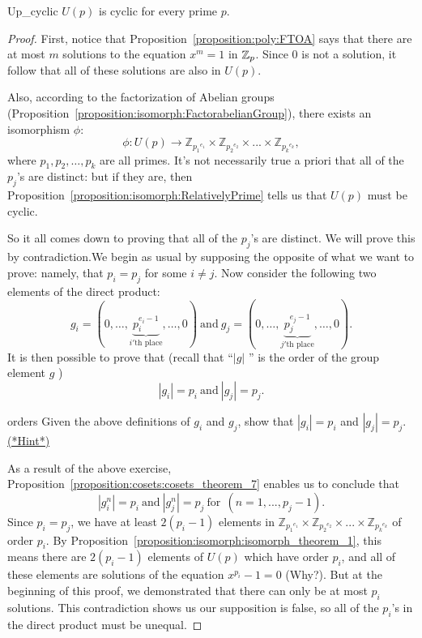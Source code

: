 \begin{prop}{Up_cyclic}
$U(p)$ is cyclic for every prime $p$.
\end {prop}
\begin{proof}
First, notice that Proposition~\ref{proposition:poly:FTOA} says that there are at most $m$ solutions to the equation $x^m = 1$ in $\mathbb{Z}_p$. Since 0 is not a solution, it follow that all of these solutions are also in $U(p)$.

Also, according to the factorization of Abelian groups (Proposition~\ref{proposition:isomorph:FactorabelianGroup}), there exists an isomorphism $\phi$:
\[\phi: U(p)  \rightarrow {\mathbb{Z}_{{p_1}^{e_1}}}  \times   {\mathbb{Z}_{{p_2}^{e_2}}}  \times  ... \times   {\mathbb{Z}_{{p_k}^{e_k}}}, \]
where $p_1, p_2, \ldots, p_k$ are all primes.  It's not necessarily true a priori  that all of the $p_j$'s are distinct: but if they are, then Proposition~\ref{proposition:isomorph:RelativelyPrime} tells us that $U(p)$ must be cyclic. 

So it all comes down to proving that all of the $p_j$'s are distinct. We will prove this by contradiction.We begin as usual by supposing the opposite of what we want to prove: namely, that $p_i = p_j$ for some $i \neq j$. 
Now consider the following two elements of the direct product:
\[
g_i = ( 0, \ldots , \underbrace{p_i^{e_i-1}}_{i'\text{th place}}, \ldots,0) \mathrm{~ and ~} g_j = ( 0, \ldots , \underbrace{p_j^{e_j-1}}_{j'\text{th place}}, \ldots,0).
\]
It is then possible to prove that (recall that ``$|g|$ '' is the order of the group element $g$ )
\[ |g_i| = p_i \mathrm{~ and ~}  |g_j| = p_j. \]

\begin{exercise}{orders}
Given the above definitions of $g_i$ and $g_j$, show that   $|g_i| = p_i$ and  $|g_j| = p_j$.
\hyperref[sec:polyrings:hints]{(*Hint*)} 
\end{exercise}
As a result of the above exercise, Proposition~\ref{proposition:cosets:cosets_theorem_7}  enables us to conclude that 
\[
|g_i^n| = p_i \mathrm{~ and ~} |g_j^n| = p_j \mathrm{~ for~~} (n = 1,...,p_j-1).
\]
Since $p_i = p_j$, we have at least $2(p_i-1)$ elements in ${\mathbb{Z}_{{p_1}^{e_1}}}  \times   {\mathbb{Z}_{{p_2}^{e_2}}}  \times  ... \times   {\mathbb{Z}_{{p_k}^{e_k}}}$ of order $p_i$. By 
Proposition~\ref{proposition:isomorph:isomorph_theorem_1}, this means there are  $2(p_i-1)$ elements of $U(p)$ which have order $p_i$, and all of these elements are solutions of the equation $x^{p_i}-1=0$ (Why?). 
But at the beginning of this proof, we demonstrated that there can only be at most $p_i$ solutions. This contradiction shows us our supposition is false, so all of the $p_i$'s in the direct product must be unequal.
\end{proof}


